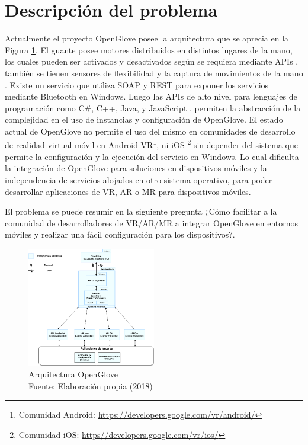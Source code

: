 \section{Descripción del problema}
\label{seccion:descripcion-problema}

  Actualmente el proyecto OpenGlove posee la  arquitectura que se aprecia en la Figura \ref{fig:arquitectura-open-glove}. El guante posee motores distribuidos en distintos lugares de la mano, los cuales pueden ser activados y desactivados según se requiera mediante APIs \citep{tesis-monsalve-rodrigo}, también se tienen sensores de flexibilidad y la captura de movimientos de la mano \citep{tesis-cerda-rodrigo} . Existe un servicio que utiliza SOAP y REST para exponer los servicios mediante Bluetooth en Windows. Luego las  APIs de alto nivel \citep{tesis-meneses-sebastian} para lenguajes de programación como C\#, C++, Java, y JavaScript , permiten la abstracción de  la complejidad en el uso de instancias y configuración de OpenGlove. El estado actual de OpenGlove no permite el uso del mismo en comunidades de desarrollo de realidad virtual móvil en Android VR\footnote{Comunidad Android: \url{https://developers.google.com/vr/android/}}, ni iOS \footnote{Comunidad iOS: \url{https//developers.google.com/vr/ios/}} sin depender del sistema que permite la configuración y la ejecución del servicio en Windows. Lo cual dificulta la integración de OpenGlove para soluciones en dispositivos móviles y la independencia de servicios alojados en otro sistema operativo,  para poder desarrollar aplicaciones de VR, AR o MR para dispositivos móviles.
  
El problema se puede resumir en la siguiente pregunta  ¿Cómo facilitar a la comunidad de desarrolladores de VR/AR/MR a integrar OpenGlove en entornos móviles y realizar una fácil configuración para los dispositivos?.
  
  \begin{figure}[H]
  \begin{center} 
   	\includegraphics[width=0.5\textwidth]{images/chapter01/Legacy-OpenGlove-Architecture.png} 
    \caption[Arquitectura OpenGlove]{Arquitectura OpenGlove \\Fuente: Elaboración propia (2018)}
    \label{fig:arquitectura-open-glove}
  \end{center}
\end{figure}

